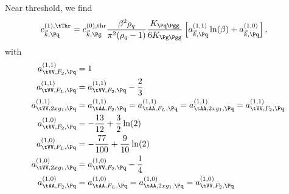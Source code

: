 Near threshold, we find
\begin{align}
c_{\vec k,\Pq}^{(1),\tThr} &= c_{\vec k,\Pg}^{(0),\text{thr}} \frac{\beta^2\rho_q}{\pi^2(\rho_q-1)} \frac{K_{\Pq\Pgg}}{6K_{\Pg\Pgg}} \left[a_{\vec k,\Pq}^{(1,1)}\ln(\beta) + a_{\vec k,\Pq}^{(1,0)}\right],
\end{align}
with
\begin{align}
a^{(1,1)}_{\tVV,F_2,\Pq} &= 1\\
a^{(1,1)}_{\tVV,F_L,\Pq} &= a^{(1,1)}_{\tVV,F_2,\Pq} - \frac 2 {3}\\
a^{(1,1)}_{\tVV,2xg_1,\Pq} &= a^{(1,1)}_{\tAA,F_2,\Pq} = a^{(1,1)}_{\tAA,F_L,\Pq} = a^{(1,1)}_{\tAA,2xg_1,\Pq}= a^{(1,1)}_{\tVV,F_2,\Pq}\\
a^{(1,0)}_{\tVV,F_2,\Pq} &= -\frac{13}{12} + \frac 3 2 \ln(2)\\
a^{(1,0)}_{\tVV,F_L,\Pq} &= -\frac{77}{100} + \frac 9 {10} \ln(2) \\
a^{(1,0)}_{\tVV,2xg_1,\Pq} &= a^{(1,0)}_{\tVV,F_2,\Pq} - \frac{1}{4}\\
a^{(1,0)}_{\tAA,F_2,\Pq} &= a^{(1,0)}_{\tAA,F_L,\Pq} = a^{(1,0)}_{\tAA,2xg_1,\Pq}= a^{(1,0)}_{\tVV,F_2,\Pq}
\end{align}

